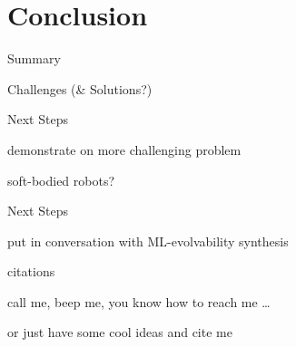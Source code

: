 \section{Conclusion}

\begin{frame}{Summary}

\end{frame}

\begin{frame}{Challenges (\& Solutions?)}

\end{frame}

\begin{frame}{Next Steps}

demonstrate on more challenging problem

soft-bodied robots?

\end{frame}

\begin{frame}{Next Steps}

put in conversation with ML-evolvability synthesis

citations

call me, beep me, you know how to reach me \dots

or just have some cool ideas and cite me

\end{frame}
